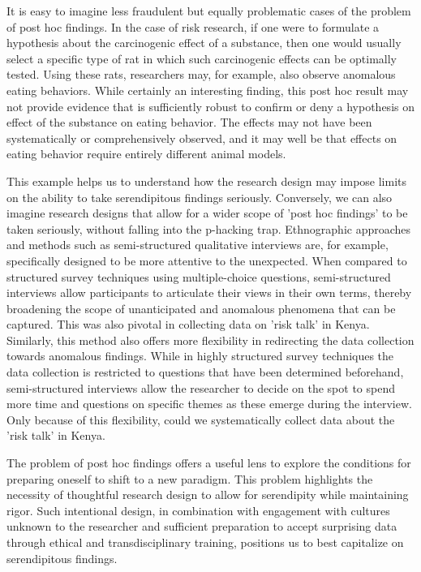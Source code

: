 \documentclass[authordate, empirical]{jote-new-article}
\begin{document}
	It is easy to imagine less fraudulent but equally problematic cases of the problem of post hoc findings. In the case of risk research, if one were to formulate a hypothesis about the carcinogenic effect of a substance, then one would usually select a specific type of rat in which such carcinogenic effects can be optimally tested. Using these rats, researchers may, for example, also observe anomalous eating behaviors. While certainly an interesting finding, this post hoc result may not provide evidence that is sufficiently robust to confirm or deny a hypothesis on effect of the substance on eating behavior. The effects may not have been systematically or comprehensively observed, and it may well be that effects on eating behavior require entirely different animal models.



	This example helps us to understand how the research design may impose limits on the ability to take serendipitous findings seriously. Conversely, we can also imagine research designs that allow for a wider scope of 'post hoc findings' to be taken seriously, without falling into the p-hacking trap. Ethnographic approaches and methods such as semi-structured qualitative interviews are, for example, specifically designed to be more attentive to the unexpected. When compared to structured survey techniques using multiple-choice questions, semi-structured interviews allow participants to articulate their views in their own terms, thereby broadening the scope of unanticipated and anomalous phenomena that can be captured. This was also pivotal in collecting data on 'risk talk' in Kenya. Similarly, this method also offers more flexibility in redirecting the data collection towards anomalous findings. While in highly structured survey techniques the data collection is restricted to questions that have been determined beforehand, semi-structured interviews allow the researcher to decide on the spot to spend more time and questions on specific themes as these emerge during the interview. Only because of this flexibility, could we systematically collect data about the 'risk talk' in Kenya.



	The problem of post hoc findings offers a useful lens to explore the conditions for preparing oneself to shift to a new paradigm. This problem highlights the necessity of thoughtful research design to allow for serendipity while maintaining rigor. Such intentional design, in combination with engagement with cultures unknown to the researcher and sufficient preparation to accept surprising data through ethical and transdisciplinary training, positions us to best capitalize on serendipitous findings.
\end{document}
